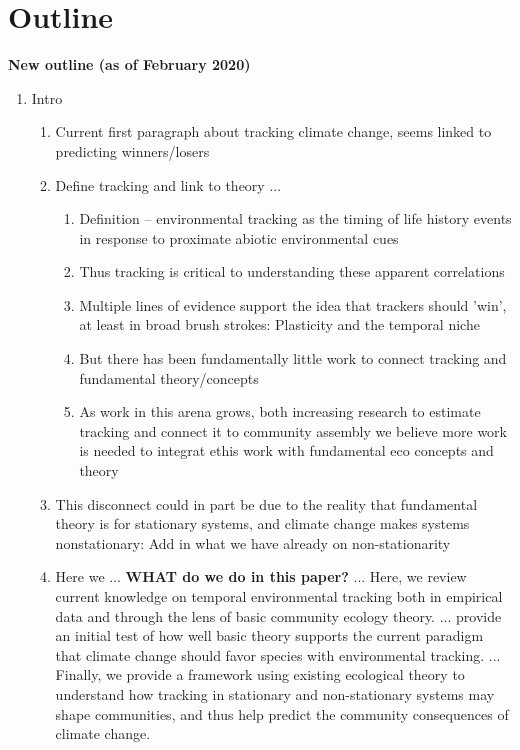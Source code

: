 \documentclass[11pt,letterpaper]{article}
\begin{document}
\newpage
\section{Outline}


{\bf New outline (as of February 2020)} 
\begin{enumerate}
\item Intro
\begin{enumerate}
\item Current first paragraph about tracking climate change, seems linked to predicting winners/losers 
\item Define tracking and link to theory ... 
\begin{enumerate}
\item Definition -- environmental tracking as the timing of life history events in response to proximate abiotic environmental cues \item Thus tracking is critical to understanding these apparent correlations
\item Multiple lines of evidence support the idea that trackers should 'win', at least in broad brush strokes: Plasticity and the temporal niche
\item But there has been fundamentally little work to connect tracking and fundamental theory/concepts
\item As work in this arena grows, both increasing research to estimate tracking and connect it to community assembly we believe more work is needed to integrat ethis work with fundamental eco concepts and theory 
\end{enumerate}
\item This disconnect could in part be due to the reality that fundamental theory is for stationary systems, and climate change makes systems nonstationary: Add in what we have already on non-stationarity
\item Here we ... {\bf WHAT do we do in this paper?} ... Here, we review current knowledge on temporal environmental tracking both in empirical data and through the lens of basic community ecology theory. ... provide an initial test of how well basic theory supports the current paradigm that climate change should favor species with environmental tracking. ... Finally, we provide a framework using existing ecological theory to understand how tracking in stationary and non-stationary systems may shape communities, and thus help predict the community consequences of climate change. 
\end{enumerate}

\end{enumerate}
\end{document}
